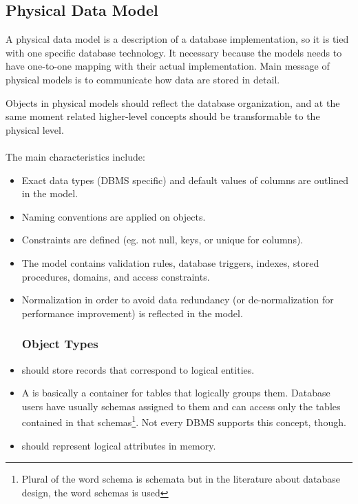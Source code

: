 \subsection{Physical Data Model}

A physical data model is a description of a database implementation, so it is tied with one specific database technology. It necessary because the models needs to have one-to-one mapping with their actual implementation. Main message of physical models is to communicate how data are stored in detail.

Objects in physical models should reflect the database organization, and at the same moment related higher-level concepts should be transformable to the physical level. \\ \\
The main characteristics include: 
\begin{itemize}
	\item Exact data types (DBMS specific) and default values of columns are outlined in the model.
	\item Naming conventions are applied on objects.
	\item Constraints are defined (eg. not null, keys, or unique for columns).
	\item The model contains validation rules, database triggers, indexes, stored procedures, domains, and access constraints.
	\item Normalization in order to avoid data redundancy (or de-normalization for performance improvement) is reflected in the model.
	\subsubsection{Object Types}
	\item {} should store records that correspond to logical entities.
	\item A  is basically a container for tables that logically groups them. Database users have usually schemas assigned to them and can access only the tables contained in that schemas\footnote{Plural of the word schema is schemata but in the literature about database design, the word schemas is used}. Not every DBMS supports this concept, though.
	\item {} should represent logical attributes in memory.
\end{itemize}

